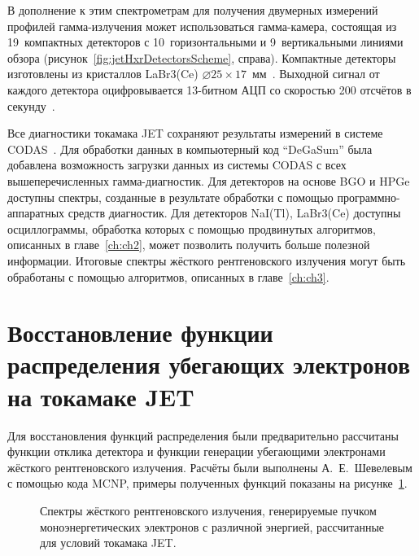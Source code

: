 В дополнение к этим спектрометрам для получения двумерных измерений профилей гамма-излучения может использоваться гамма-камера, состоящая из 19~компактных детекторов с 10~горизонтальными и 9~вертикальными линиями обзора (рисунок~\ref{fig:jetHxrDetectorsScheme}, справа). Компактные детекторы изготовлены из кристаллов LaBr3(Ce) $\varnothing 25 \times 17$~мм~\cite{Rigamonti2018}. Выходной сигнал от каждого детектора оцифровывается 13-битном АЦП со скоростью 200 отсчётов в секунду~\cite{Fernandes2018}.

Все диагностики токамака JET сохраняют результаты измерений в системе CODAS~\cite{Jones1986}. Для обработки данных в компьютерный код ``DeGaSum'' была добавлена возможность загрузки данных из системы CODAS с всех вышеперечисленных гамма-диагностик. Для детекторов на основе BGO и HPGe доступны спектры, созданные в результате обработки с помощью программно-аппаратных средств диагностик. Для детекторов NaI(Tl), LaBr3(Ce) доступны осциллограммы, обработка которых с помощью продвинутых алгоритмов, описанных в главе~\ref{ch:ch2}, может позволить получить больше полезной информации. Итоговые спектры жёсткого рентгеновского излучения могут быть обработаны с помощью алгоритмов, описанных в главе~\ref{ch:ch3}. 


\section{Восстановление функции распределения убегающих электронов на токамаке JET}

Для восстановления функций распределения были предварительно рассчитаны функции отклика детектора и функции генерации убегающими электронами жёсткого рентгеновского излучения. Расчёты были выполнены А.~Е.~Шевелевым с помощью кода MCNP, примеры полученных функций показаны на рисунке~\ref{fig:jetGenerationFunctions}. 

\begin{figure}[ht!]
  \caption{ Спектры жёсткого рентгеновского излучения, генерируемые пучком моноэнергетических электронов с различной энергией, рассчитанные для условий токамака JET.~\cite{Shevelev2013} }
  \label{fig:jetGenerationFunctions}
\end{figure}


